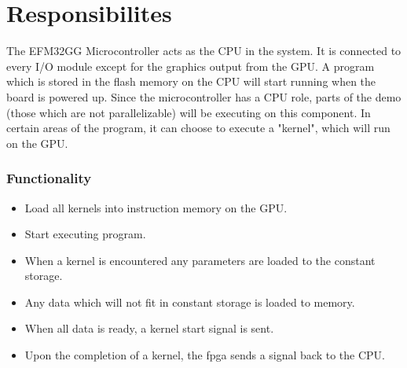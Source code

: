 \section{Responsibilites}

The EFM32GG Microcontroller acts as the CPU in the system.
It is connected to every I/O module except for the graphics output from the GPU.
A program which is stored in the flash memory on the CPU will start running when the board is powered up.
Since the microcontroller has a CPU role, parts of the demo (those which are not parallelizable)
will be executing on this component.
In certain areas of the program, it can choose to execute a "kernel", which will run on the GPU.

\subsubsection{Functionality}

\begin{itemize}
  \item Load all kernels into instruction memory on the GPU.
  \item Start executing program.
  \item When a kernel is encountered any parameters are loaded to the constant storage.
  \item Any data which will not fit in constant storage is loaded to memory.
  \item When all data is ready, a kernel start signal is sent.
  \item Upon the completion of a kernel, the fpga sends a signal back to the CPU.
\end{itemize}
